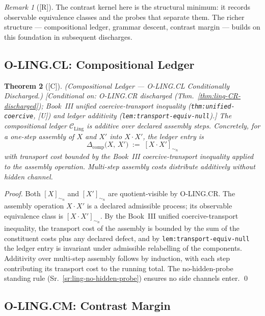 \documentclass[12pt,oneside]{amsbook}
\theoremstyle{plain}
\newtheorem{theorem}{Theorem}[section]
\theoremstyle{definition}
\theoremstyle{remark}
\newtheorem{remark}[theorem]{Remark}
\newcommand{\status}[1]{\textup{[#1]}}
\begin{document}
\begin{remark}[\status{R}]\label{rem:ling-CR-scope}
The contrast kernel here is the structural minimum: it records
observable equivalence classes and the probes that separate them.
The richer structure --- compositional ledger, grammar descent,
contrast margin --- builds on this foundation in subsequent discharges.
\end{remark}

\subsection{O-LING.CL: Compositional Ledger}\label{sec:ling-CL-discharge}

\begin{theorem}[\status{C}]\label{thm:ling-CL-discharged}
\textup{(Compositional Ledger --- O-LING.CL Conditionally Discharged.)}
\textup{[Conditional on: O-LING.CR discharged
(Thm.~\ref{thm:ling-CR-discharged}); Book~III unified
coercive-transport inequality (\texttt{thm:unified-coercive}, [U])
and ledger additivity (\texttt{lem:transport-equiv-null}).]}
The compositional ledger $\mathcal{C}_{\mathrm{Ling}}$ is additive over
declared assembly steps. Concretely, for a one-step assembly of
$X$ and $X'$ into $X \cdot X'$, the ledger entry is
\[
 \Delta_{\mathrm{comp}}\!\bigl(X,\, X'\bigr)
 \;:=\; [X \cdot X']_{\sim_n}
\]
with transport cost bounded by the Book~III coercive-transport
inequality applied to the assembly operation. Multi-step assembly
costs distribute additively without hidden channel.
\end{theorem}

\begin{proof}
Both $[X]_{\sim_n}$ and $[X']_{\sim_n}$ are quotient-visible by
O-LING.CR. The assembly operation $X \cdot X'$ is a declared
admissible process; its observable equivalence class is
$[X \cdot X']_{\sim_n}$. By the Book~III unified coercive-transport
inequality, the transport cost of the assembly is bounded by the sum
of the constituent costs plus any declared defect, and by
\texttt{lem:transport-equiv-null} the ledger entry is invariant under
admissible relabelling of the components. Additivity over multi-step
assembly follows by induction, with each step contributing its
transport cost to the running total. The no-hidden-probe standing
rule (Sr.~\ref{sr:ling-no-hidden-probe}) ensures no side channels
enter.
\qed
\end{proof}

\subsection{O-LING.CM: Contrast Margin}\label{sec:ling-CM-discharge}
\end{document}
